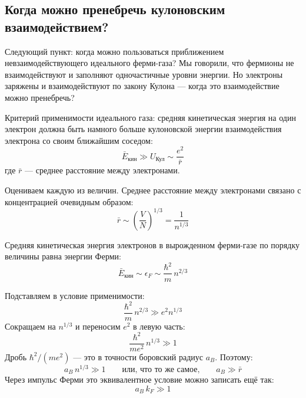 \documentclass[../general/general]{subfiles}
\begin{document}
\subsection{Когда можно пренебречь кулоновским взаимодействием?}

Следующий пункт: когда можно пользоваться приближением невзаимодействующего идеального ферми-газа? Мы говорили, что фермионы не взаимодействуют и заполняют одночастичные уровни энергии. Но электроны заряжены и взаимодействуют по закону Кулона — когда это взаимодействие можно пренебречь?

Критерий применимости идеального газа: средняя кинетическая энергия на один электрон должна быть намного больше кулоновской энергии взаимодействия электрона со своим ближайшим соседом:
\begin{equation}
    \bar{E}_{\text{кин}} \gg U_{\text{Кул}} \sim \frac{e^2}{\bar{r}}
\end{equation}
где $\bar{r}$ — среднее расстояние между электронами.

Оцениваем каждую из величин. Среднее расстояние между электронами связано с концентрацией очевидным образом:
\begin{equation}
    \bar{r} \sim \left(\frac{V}{N}\right)^{1/3} = \frac{1}{n^{1/3}}
\end{equation}

Средняя кинетическая энергия электронов в вырожденном ферми-газе по порядку величины равна энергии Ферми:
\begin{equation}
    \bar{E}_{\text{кин}} \sim \epsilon_F \sim \frac{\hbar^2}{m}\, n^{2/3}
\end{equation}

Подставляем в условие применимости:
\begin{equation}
    \frac{\hbar^2}{m}\, n^{2/3} \gg e^2 n^{1/3}
\end{equation}
Сокращаем на $n^{1/3}$ и переносим $e^2$ в левую часть:
\begin{equation}
    \frac{\hbar^2}{m e^2}\, n^{1/3} \gg 1
\end{equation}
Дробь $\hbar^2 / (m e^2)$ — это в точности боровский радиус $a_B$. Поэтому:
\begin{equation}
    a_B\, n^{1/3} \gg 1 \qquad \text{или, что то же самое,} \qquad a_B \gg \bar{r}
\end{equation}
Через импульс Ферми это эквивалентное условие можно записать ещё так:
\begin{equation}
    a_B\, k_F \gg 1
\end{equation}
\end{document}
